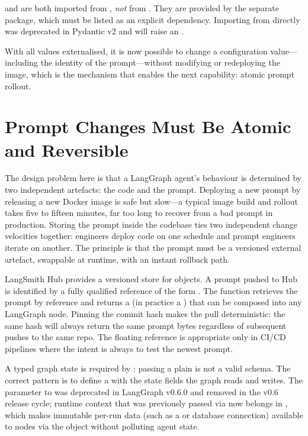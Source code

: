 \begin{notebox}
   and  are both imported from
  , \emph{not} from . They are
  provided by the separate  package, which must be
  listed as an explicit dependency. Importing  from
   directly was deprecated in Pydantic v2 and will raise an
  .
\end{notebox}

With all values externalised, it is now possible to change a configuration
value---including the identity of the prompt---without modifying or
redeploying the image, which is the mechanism that enables the next
capability: atomic prompt rollout.

\section{Prompt Changes Must Be Atomic and Reversible}
\label{sec:zero-downtime-rollout}

The design problem here is that a LangGraph agent's behaviour is determined
by two independent artefacts: the code and the prompt. Deploying a new prompt
by releasing a new Docker image is safe but slow---a typical image build and
rollout takes five to fifteen minutes, far too long to recover from a bad
prompt in production. Storing the prompt inside the codebase ties two
independent change velocities together: engineers deploy code on one schedule
and prompt engineers iterate on another. The principle is that the prompt must
be a versioned external artefact, swappable at runtime, with an instant
rollback path.

LangSmith Hub provides a versioned store for 
objects. A prompt pushed to Hub is identified by a fully qualified reference
of the form . The 
function retrieves the prompt by reference and returns a  (in
practice a ) that can be composed into any LangGraph
node. Pinning the commit hash makes the pull deterministic: the same hash
will always return the same prompt bytes regardless of subsequent pushes to
the same repo. The floating  reference is appropriate only in
CI/CD pipelines where the intent is always to test the newest prompt.

A typed graph state is required by : passing a plain
 is not a valid schema. The correct pattern is to define a
 with the state fields the graph reads and writes. The
 parameter to  was deprecated in
LangGraph v0.6.0 and removed in the v0.6 release cycle; runtime context that
was previously passed via  now belongs in
, which makes immutable per-run data (such as a
 or database connection) available to nodes via the
 object without polluting agent state.

